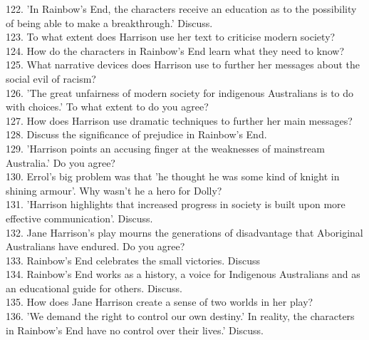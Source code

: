\documentclass[a4paper]{article}
\begin{document}
122. 'In Rainbow's End, the characters receive an education as to the possibility of being able to make a breakthrough.' Discuss.\\

123. To what extent does Harrison use her text to criticise modern society?\\

124. How do the characters in Rainbow's End learn what they need to know?\\

125. What narrative devices does Harrison use to further her messages about the social evil of racism?\\

126. 'The great unfairness of modern society for indigenous Australians is to do with choices.' To what extent to do you agree?\\

127. How does Harrison use dramatic techniques to further her main messages?\\

128. Discuss the significance of prejudice in Rainbow's End.\\

129. 'Harrison points an accusing finger at the weaknesses of mainstream Australia.' Do you agree?\\

130. Errol's big problem was that 'he thought he was some kind of knight in shining armour'. Why wasn't he a hero for Dolly?\\

131. 'Harrison highlights that increased progress in society is built upon more effective communication'. Discuss.\\

132. Jane Harrison's play mourns the generations of disadvantage that Aboriginal Australians have endured. Do you agree?\\

133. Rainbow's End celebrates the small victories. Discuss\\

134. Rainbow's End works as a history, a voice for Indigenous Australians and as an educational guide for others. Discuss.\\

135. How does Jane Harrison create a sense of two worlds in her play?\\

136. 'We demand the right to control our own destiny.' In reality, the characters in Rainbow's End have no control over their lives.' Discuss.\\
\end{document}
